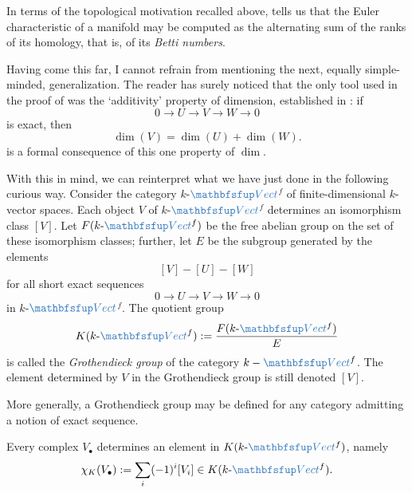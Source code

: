 In terms of the topological motivation recalled above,
 tells us that the Euler characteristic of a
manifold may be computed as the alternating sum of the ranks of its
homology, that is, of its \emph{Betti numbers}.

Having come this far, I cannot refrain from mentioning the next,
equally simple-minded, generalization. The reader has surely noticed
that the only tool used in the proof of  was the
`additivity' property of dimension, established in :
if
\[
  0 \to U \to V \to W \to 0
\]
is exact, then
\[
  \dim(V) = \dim(U) + \dim(W).
\]
 is a formal consequence of this one property of
$\dim$.

With this in mind, we can reinterpret what we have just done in the
following curious way. Consider the category
$k$-$\categ{Vect}$$^f$ of finite-dimensional
$k$-vector spaces. Each object $V$ of
$k$-$\categ{Vect}$$^f$ determines an isomorphism class $[V]$. Let
$F(k\text{-}\categ{Vect}^f)$ be the free abelian group on the set of
these isomorphism classes; further, let $E$ be the subgroup generated
by the elements
\[ [V] - [U] - [W]
\]
for all short exact sequences
\[
  0 \to U \to V \to W \to 0
\]
in $k$-$\categ{Vect}$$^f$. The quotient group
\[
  K(k\text{-}\categ{Vect}^f) := \frac{F(k\text{-}\categ{Vect}^f)}{E}
\]
is called the \emph{Grothendieck group} of the category
$k-\categ{Vect}^f$. The element determined by
$V$ in the Grothendieck group is still denoted $[V]$.

More generally, a Grothendieck group may be defined for any category
admitting a notion of exact sequence.

Every complex $V_\bullet$ determines an element in
$K(k\text{-}\categ{Vect}^f)$, namely
\[
  \chi_K(V_\bullet) \df \sum_i (-1)^i [V_i] \in
  K(k\text{-}\categ{Vect}^f).
\]

